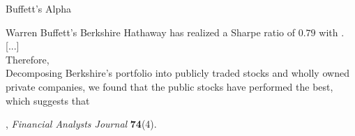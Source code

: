 \documentclass[9pt,english,aspectratio=169]{beamer}
\begin{document}
\begin{frame}{Buffett's Alpha}

  \vspace{0.4em}
  \begin{quotebox}
    Warren Buffett's Berkshire Hathaway has realized a Sharpe ratio of
    $0.79$ with . [...] \\

    Therefore,   \\

    Decomposing Berkshire's portfolio into publicly traded stocks and wholly owned private companies, we found that the public stocks have performed the best, which suggests that 
  \end{quotebox}

  \vspace{0.5em}
  \hfill{\small {}, \emph{Financial Analysts
  Journal} \textbf{74}(4).}

\end{frame}


\end{document}
